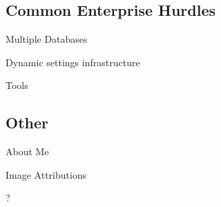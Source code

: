 \documentclass[19.9pt]{beamer}
\begin{document}
	\subsection{Common Enterprise Hurdles}
		\begin{frame}
			{Multiple Databases}
		\end{frame}
		\begin{frame}
			{Dynamic settings infrastructure}
		\end{frame}
		\begin{frame}
			{Tools}
		\end{frame}
	
	
	\subsection{Other}
		\begin{frame}
			{About Me}
		\end{frame}
		\begin{frame}
			{Image Attributions}
		\end{frame}
		\begin{frame}
			?
		\end{frame}
\end{document}
